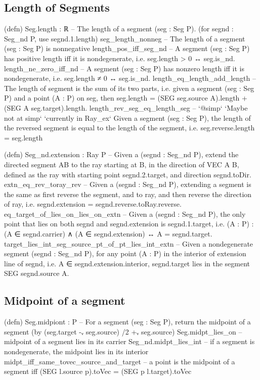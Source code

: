 \documentclass[12pt,a4paper]{article}
\begin{document}
\subsection{Length of Segments}

    (defn) Seg.length : ℝ -- The length of a segment (seg : Seg P).  (for segnd : Seg_nd P, use segnd.1.length)
    seg_length_nonneg -- The length of a segment (seg : Seg P) is nonnegative
    length_pos_iff_seg_nd -- A segment (seg : Seg P) has positive length iff it is nondegenerate, i.e. seg.length > 0 ↔ seg.is_nd.
    length_ne_zero_iff_nd -- A segment (seg : Seg P) has nonzero length iff it is nondegenerate, i.e. seg.length ≠ 0 ↔ seg.is_nd.
    length_eq_length_add_length -- The length of segment is the sum of its two parts, i.e. given a segment (seg : Seg P) and a point (A : P) on seg, then seg.length = (SEG seg.source A).length + (SEG A seg.target).length.
    length_rev_seg_eq_length_seg -- `@simp` `Maybe not at simp` `currently in Ray_ex` Given a segment (seg : Seg P), the length of the reversed segment is equal to the length of the segment, i.e. seg.reverse.length = seg.length

    (defn) Seg_nd.extension : Ray P -- Given a (segnd : Seg_nd P), extend the directed segment AB to the ray starting at B, in the direction of VEC A B, defined as the ray with starting point segnd.2.target, and direction segnd.toDir.
    extn_eq_rev_toray_rev -- Given a (segnd : Seg_nd P), extending a segment is the same as first reverse the segment, and to ray, and then reverse the direction of ray, i.e. segnd.extension = segnd.reverse.toRay.reverse.
    eq_target_of_lies_on_lies_on_extn -- Given a (segnd : Seg_nd P), the only point that lies on both segnd and segnd.extension is segnd.1.target, i.e. (A : P) : (A ∈ segnd.carrier) ∧ (A ∈ segnd.extension) ↔ A = segnd.target.
    target_lies_int_seg_source_pt_of_pt_lies_int_extn -- Given a nondegenerate segment (segnd : Seg_nd P), for any point (A : P) in the interior of extension line of segnd, i.e. A ∈ segnd.extension.interior, segnd.target lies in the segment SEG segnd.source A.


\subsection{Midpoint of a segment}

    (defn) Seg.midpiont : P -- For a segment (seg : Seg P), return the midpoint of a segment (by (seg.target -ᵥ seg.source) /2 +ᵥ seg.source)
    Seg.midpt_lies_on -- midpoint of a segment lies in its carrier
    Seg_nd.midpt_lies_int -- if a segment is nondegenerate, the midpoint lies in its interior
    midpt_iff_same_tovec_source_and_target -- a point is the midpoint of a segment iff (SEG l.source p).toVec = (SEG p l.target).toVec
    
\end{document}
